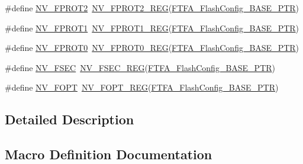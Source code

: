 \begin{DoxyCompactItemize}
\item 
\#define \hyperlink{group___n_v___register___accessor___macros_gaedf00f22b7dabfa124aeb38cdd5fb8a8}{N\+V\+\_\+\+F\+P\+R\+O\+T2}~\hyperlink{group___n_v___register___accessor___macros_gabac2653345915e29796a13ba870336c3}{N\+V\+\_\+\+F\+P\+R\+O\+T2\+\_\+\+R\+EG}(\hyperlink{group___n_v___peripheral_ga3458652dfc38239f92682556e63596b5}{F\+T\+F\+A\+\_\+\+Flash\+Config\+\_\+\+B\+A\+S\+E\+\_\+\+P\+TR})
\item 
\#define \hyperlink{group___n_v___register___accessor___macros_ga35eb345943dea70476ecc9f1cc3db473}{N\+V\+\_\+\+F\+P\+R\+O\+T1}~\hyperlink{group___n_v___register___accessor___macros_ga2cb779bd7985368b49343a7a4227a4c2}{N\+V\+\_\+\+F\+P\+R\+O\+T1\+\_\+\+R\+EG}(\hyperlink{group___n_v___peripheral_ga3458652dfc38239f92682556e63596b5}{F\+T\+F\+A\+\_\+\+Flash\+Config\+\_\+\+B\+A\+S\+E\+\_\+\+P\+TR})
\item 
\#define \hyperlink{group___n_v___register___accessor___macros_gabd1755172d62e3c49cb9e79d2065a147}{N\+V\+\_\+\+F\+P\+R\+O\+T0}~\hyperlink{group___n_v___register___accessor___macros_ga7142989d8224cb5f1b5e466c72363e3a}{N\+V\+\_\+\+F\+P\+R\+O\+T0\+\_\+\+R\+EG}(\hyperlink{group___n_v___peripheral_ga3458652dfc38239f92682556e63596b5}{F\+T\+F\+A\+\_\+\+Flash\+Config\+\_\+\+B\+A\+S\+E\+\_\+\+P\+TR})
\item 
\#define \hyperlink{group___n_v___register___accessor___macros_ga6bdca22aa1e76ebd389ecf4a5d70b93c}{N\+V\+\_\+\+F\+S\+EC}~\hyperlink{group___n_v___register___accessor___macros_ga67787d311ca4c58b135b4427b0431dca}{N\+V\+\_\+\+F\+S\+E\+C\+\_\+\+R\+EG}(\hyperlink{group___n_v___peripheral_ga3458652dfc38239f92682556e63596b5}{F\+T\+F\+A\+\_\+\+Flash\+Config\+\_\+\+B\+A\+S\+E\+\_\+\+P\+TR})
\item 
\#define \hyperlink{group___n_v___register___accessor___macros_gad508c386413905d31c12a2319fa355e3}{N\+V\+\_\+\+F\+O\+PT}~\hyperlink{group___n_v___register___accessor___macros_ga0fd99fc3ae6d1b27bb5e0448f6c90761}{N\+V\+\_\+\+F\+O\+P\+T\+\_\+\+R\+EG}(\hyperlink{group___n_v___peripheral_ga3458652dfc38239f92682556e63596b5}{F\+T\+F\+A\+\_\+\+Flash\+Config\+\_\+\+B\+A\+S\+E\+\_\+\+P\+TR})
\end{DoxyCompactItemize}


\subsection{Detailed Description}


\subsection{Macro Definition Documentation}
\mbox{\label{group___n_v___register___accessor___macros_gadb8e2eb4db4de2a485b31c2a1dd393af}} 
